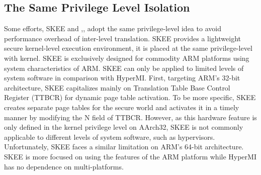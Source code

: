 \documentclass[conference]{IEEEtran}
\begin{document}
\subsection{The Same Privilege Level Isolation}
Some efforts, 
 SKEE\cite{Azab2016SKEE} and \cite{Wang2015SecPod},\cite{Deng2017Dancing}, adopt the same privilege-level idea to avoid performance overhead of inter-level translation.
 SKEE provides a lightweight secure kernel-level execution environment, it is placed at the same privilege-level with kernel. SKEE is exclusively designed for commodity ARM platforms using system characteristics of ARM. 
SKEE can only be applied to limited levels of system software in comparison with HyperMI. First, targeting ARM's 32-bit architecture, SKEE capitalizes mainly on Translation Table Base Control Register (TTBCR) for dynamic page table activation. To be more specific, SKEE creates separate page tables for the secure world and activates it in a timely manner by modifying the N field of TTBCR. However, as this hardware feature is only defined in the kernel privilege level on AArch32, SKEE is not commonly applicable to different levels of system software, such as hypervisors. Unfortunately, SKEE faces a similar limitation on ARM's 64-bit architecture. SKEE is more focused on using the features of the ARM platform while HyperMI has no dependence on multi-platforms.
\end{document}
